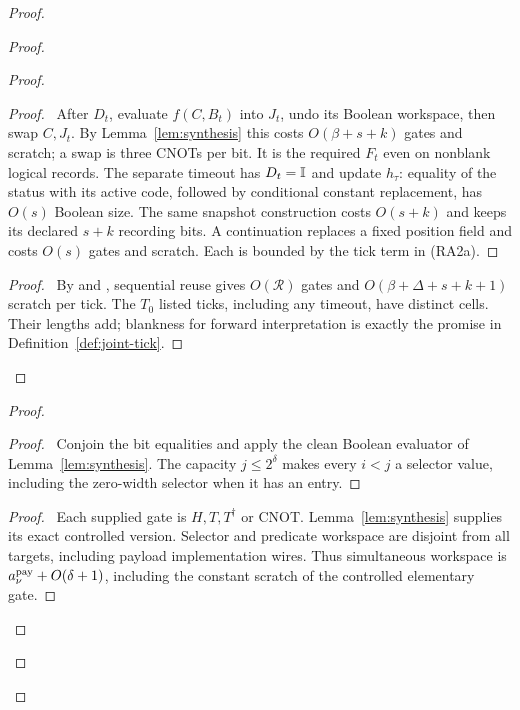 \begin{proof}
\begin{proof}
\begin{proof}
   \begin{proof}\pf\ After $D_t$, evaluate $f(C,B_t)$ into $J_t$,
   undo its Boolean workspace, then swap $C,J_t$. By
   Lemma~\ref{lem:synthesis} this costs $O(\beta+s+k)$ gates and
   scratch; a swap is three CNOTs per bit. It is the required $F_t$
   even on nonblank logical records. The separate timeout has
   $D_t=\mathbb{I}$ and update $h_\tau$: equality of the status with its
   active code, followed by conditional constant replacement, has
   $O(s)$ Boolean size. The same snapshot construction costs
   $O(s+k)$ and keeps its declared $s+k$ recording bits. A continuation
   replaces a fixed position field and costs $O(s)$ gates and scratch.
   Each is bounded by the tick term in (RA2a).\end{proof}
   \qedstep
   \begin{proof}\pf\ By  and
   , sequential reuse gives $O(\mathcal R)$
   gates and $O(\beta+\Delta+s+k+1)$ scratch per tick.
   The $T_0$ listed ticks, including any timeout, have distinct cells.
   Their lengths add; blankness for forward interpretation is exactly
   the promise in Definition~\ref{def:joint-tick}.\end{proof}
  \end{proof}
\begin{proof}
 \begin{proof}\pf\ Conjoin the bit equalities and apply the clean
 Boolean evaluator of Lemma~\ref{lem:synthesis}. The capacity
 $j\leq2^\delta$ makes every $i<j$ a selector value, including
 the zero-width selector when it has an entry.\end{proof}
 \begin{proof}\pf\ Each supplied gate is $H,T,T^\dagger$ or CNOT.
 Lemma~\ref{lem:synthesis} supplies its exact controlled version.
 Selector and predicate workspace are disjoint from all targets,
 including payload implementation wires. Thus simultaneous
 workspace is $a_\nu^{\rm pay}+O(\delta+1)$, including the
 constant scratch of the controlled elementary gate.\end{proof}
\end{proof}
\end{proof}
\end{proof}
